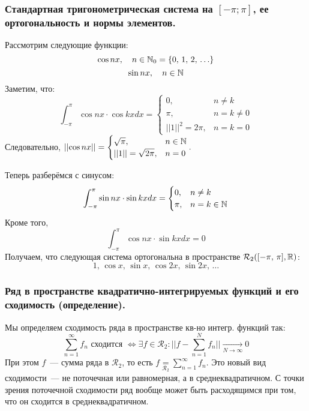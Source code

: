 \subsubsection{Стандартная тригонометрическая система на $[-\pi; \pi]$, ее ортогональность и нормы элементов.}
\begin{example}
    Рассмотрим следующие функции:
    \[\cos nx, \quad n \in \mathbb{N}_0 = \left\{ 0,\, 1,\, 2,\, \ldots \right\}\]
    \[\sin nx, \quad n \in \mathbb{N}\]
    Заметим, что:
    \[\int_{-\pi}^{\pi} \cos nx \cdot \cos kx dx = \begin{cases}
        0, &n \neq k \\
        \pi, &n = k \neq 0 \\
        \lvert \lvert 1 \rvert \rvert^2 = 2\pi, &n = k = 0
    \end{cases}\]
    Следовательно, $\lvert \lvert \cos nx \rvert \rvert = \begin{cases}
        \sqrt{\pi}, &n \in \mathbb{N} \\
        \lvert \lvert 1 \rvert \rvert = \sqrt{2\pi}, &n = 0
    \end{cases}.$

    Теперь разберёмся с синусом:
    \[\int_{-\pi}^\pi \sin nx \cdot \sin kx dx = \begin{cases}
        0, &n \neq k \\
        \pi, &n = k \in \mathbb{N}
    \end{cases}\]
    Кроме того, 
    \[\int_{-\pi}^\pi \cos nx \cdot \sin kx dx = 0\]
    Получаем, что следующая система ортогональна в пространстве $\mathcal{R}_2 ([-\pi,\, \pi], \mathbb{R})$:
    \[1,\, \cos x,\, \sin x,\, \cos 2x,\, \sin 2x,\, \ldots\]
\end{example}
\subsubsection{Ряд в пространстве квадратично-интегрируемых функций и его сходимость (определение).}
    Мы определяем сходимость ряда в пространстве кв-но интегр. функций так:
    \[\sum_{n=1}^\infty f_n \text{ сходится } \iff \exists f \in \mathcal{R}_2: \lvert \lvert f - \sum_{n=1}^N f_n \rvert \rvert \xrightarrow[N\to \infty]{} 0\]
    При этом $f$~--- сумма ряда в $\mathcal{R}_2$, то есть $f \underset{\mathcal{R}_2}{=} \sum_{n=1}^{\infty} f_n$. Это новый вид сходимости~--- не поточечная или равномерная, а в среднеквадратичном. С точки зрения поточечной сходимости ряд вообще может быть расходящимся при том, что он сходится в среднеквадратичном.
